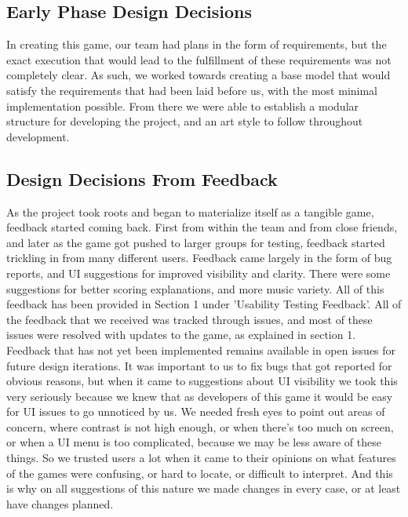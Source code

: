 \documentclass{article}
\begin{document}


\subsection{Early Phase Design Decisions}

In creating this game, our team had plans in the form of requirements, but the exact execution that would lead to the fulfillment of these requirements was not completely clear. As such, we worked towards creating a base model that would satisfy the requirements that had been laid before us, with the most minimal implementation possible. From there we were able to establish a modular structure for developing the project, and an art style to follow throughout development.

\subsection{Design Decisions From Feedback}

As the project took roots and began to materialize itself as a tangible game, feedback started coming back. First from within the team and from close friends, and later as the game got pushed to larger groups for testing, feedback started trickling in from many different users. Feedback came largely in the form of bug reports, and UI suggestions for improved visibility and clarity. There were some suggestions for better scoring explanations, and more music variety. All of this feedback has been provided in Section 1 under 'Usability Testing Feedback'. All of the feedback that we received was tracked through issues, and most of these issues were resolved with updates to the game, as explained in section 1. Feedback that has not yet been implemented remains available in open issues for future design iterations. It was important to us to fix bugs that got reported for obvious reasons, but when it came to suggestions about UI visibility we took this very seriously because we knew that as developers of this game it would be easy for UI issues to go unnoticed by us. We needed fresh eyes to point out areas of concern, where contrast is not high enough, or when there's too much on screen, or when a UI menu is too complicated, because we may be less aware of these things. So we trusted users a lot when it came to their opinions on what features of the games were confusing, or hard to locate, or difficult to interpret. And this is why on all suggestions of this nature we made changes in every case, or at least have changes planned.
\end{document}
